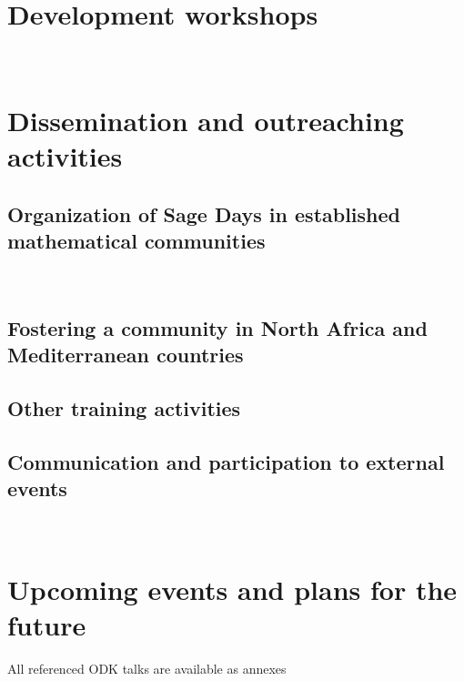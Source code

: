 \documentclass{../../Proposal/LaTeX-proposal/deliverablereport}
\author{Viviane Pons}
\begin{document}
\maketitle
\githubissuedescription


\section{Development workshops}
~








\section{Dissemination and outreaching activities}

\subsection{Organization of Sage Days in established mathematical communities}
~





\subsection{Fostering a community in North Africa and Mediterranean countries}

\subsection{Other training activities}

\subsection{Communication and participation to external events}
~

















\section{Upcoming events and plans for the future}




\footnotesize{All referenced ODK talks are available as annexes}
\end{document}

